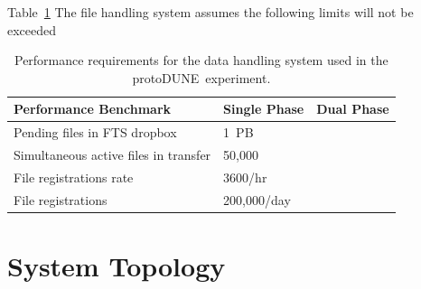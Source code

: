 \documentclass[pdftex,12pt,letter]{article}
\newcommand{\pd}{protoDUNE\ }
\begin{document}
Table~\ref{fig:dh_perf} The file handling system assumes the following limits will not be exceeded

\begin{table}[tbh]
\centering
\begin{tabular}{l l l}
\hline
\textbf{Performance Benchmark} & \textbf{Single Phase} & \textbf{Dual Phase}\\
\hline
\hline
Pending files in FTS dropbox             & 1~PB        & \\
Simultaneous active files in transfer    & 50,000      & \\
File registrations rate                  & 3600/hr     & \\
File registrations                       & 200,000/day & \\
\hline
\end{tabular}
\caption{\label{fig:dh_perf}Performance requirements for the data handling system used in the \pd experiment.}
\end{table}

\section{System Topology}
\end{document}
